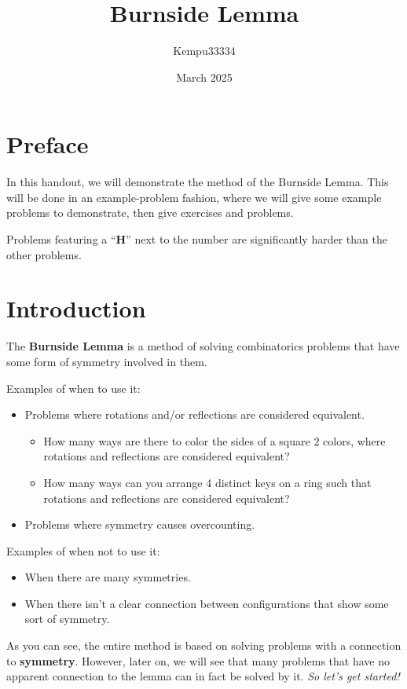 \documentclass[11pt]{scrartcl}
\title{Burnside Lemma}
\author{\LARGE Kempu33334}
\date{\large March 2025}
\begin{document}
\maketitle

\section{Preface}
\large

In this handout, we will demonstrate the method of the Burnside Lemma. This will be done in an example-problem fashion, where we will give some example problems to demonstrate, then give exercises and problems. 

Problems featuring a ``\textbf{H}'' next to the number are significantly harder than the other problems.

\section{Introduction}

The \textbf{Burnside Lemma} is a method of solving combinatorics problems that have some form of symmetry involved in them.

\begin{example*}
  Examples of when to use it:
  \begin{itemize}
  \item Problems where rotations and/or reflections are considered equivalent.
  \begin{itemize}
      \item How many ways are there to color the sides of a square $2$ colors, where rotations and reflections are considered equivalent?
      \item How many ways can you arrange 4 distinct keys on a ring such that rotations and reflections are considered equivalent?
  \end{itemize}
  \item Problems where symmetry causes overcounting.
  \end{itemize}
  Examples of when not to use it:
  \begin{itemize}
      \item When there are many symmetries.
      \item When there isn't a clear connection between configurations that show some sort of symmetry.
  \end{itemize}
\end{example*}

As you can see, the entire method is based on solving problems with a connection to \textbf{symmetry}. However, later on, we will see that many problems that have no apparent connection to the lemma can in fact be solved by it. \textit{So let's get started!}
\end{document}
